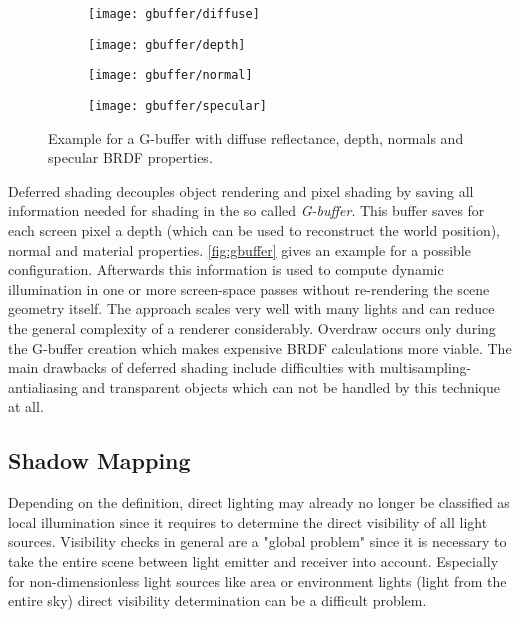 \documentclass[thesis.tex]{subfiles}
\begin{document}
\begin{figure}[h]
\centering
\begin{subfigure}[b]{0.24\textwidth}
	\texttt{[image: gbuffer/diffuse]}
\end{subfigure}
\begin{subfigure}[b]{0.24\textwidth}
	\texttt{[image: gbuffer/depth]}
\end{subfigure}
\begin{subfigure}[b]{0.24\textwidth}
	\texttt{[image: gbuffer/normal]}
\end{subfigure}
\begin{subfigure}[b]{0.24\textwidth}
	\texttt{[image: gbuffer/specular]}
\end{subfigure}
\caption{Example for a G-buffer with diffuse reflectance, depth, normals and specular BRDF properties.} \label{fig:gbuffer}
\end{figure}
Deferred shading decouples object rendering and pixel shading by saving all information needed for shading in the so called \emph{G-buffer}.
This buffer saves for each screen pixel a depth (which can be used to reconstruct the world position), normal and material properties.
\autoref{fig:gbuffer} gives an example for a possible configuration.
Afterwards this information is used to compute dynamic illumination in one or more screen-space passes without re-rendering the scene geometry itself.
The approach scales very well with many lights and can reduce the general complexity of a renderer considerably.
Overdraw occurs only during the G-buffer creation which makes expensive BRDF calculations more viable.
The main drawbacks of deferred shading include difficulties with multisampling-antialiasing and transparent objects which can not be handled by this technique at all.


\subsection{Shadow Mapping}
Depending on the definition, direct lighting may already no longer be classified as local illumination since it requires to determine the direct visibility of all light sources. 
Visibility checks in general are a "global problem" since it is necessary to take the entire scene between light emitter and receiver into account.
Especially for non-dimensionless light sources like area or environment lights (light from the entire sky) direct visibility determination can be a difficult problem.
\end{document}
